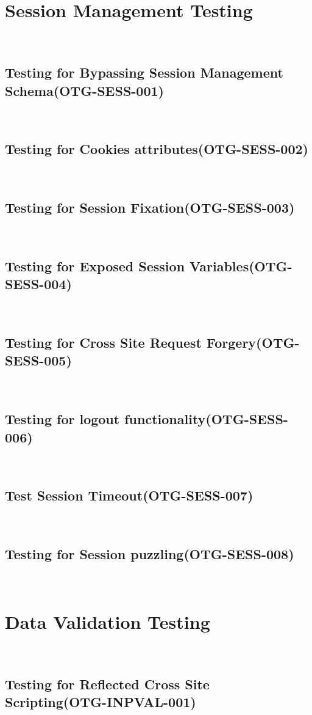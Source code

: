 \documentclass[headsepline,footsepline,footinclude=false,oneside,fontsize=11pt,paper=a4,listof=totoc,bibliography=totoc]{scrbook} %
\begin{document}
\pagebreak 
\section{Session Management Testing}\
\subsection{Testing for Bypassing Session Management Schema(OTG-SESS-001)}\
\pagebreak 
\subsection{Testing for Cookies attributes(OTG-SESS-002)}\
\pagebreak 
\subsection{Testing for Session Fixation(OTG-SESS-003)}\

\pagebreak 
\subsection{Testing for Exposed Session Variables(OTG-SESS-004)}\
\pagebreak 
\subsection{Testing for Cross Site Request Forgery(OTG-SESS-005)}\
\pagebreak 
\subsection{Testing for logout functionality(OTG-SESS-006)}\
\pagebreak 
\subsection{Test Session Timeout(OTG-SESS-007)}\
\pagebreak 
\subsection{Testing for Session puzzling(OTG-SESS-008)}\ 

\pagebreak 
\section{Data Validation Testing}\
\subsection{Testing for Reflected Cross Site Scripting(OTG-INPVAL-001)}\
\end{document}
